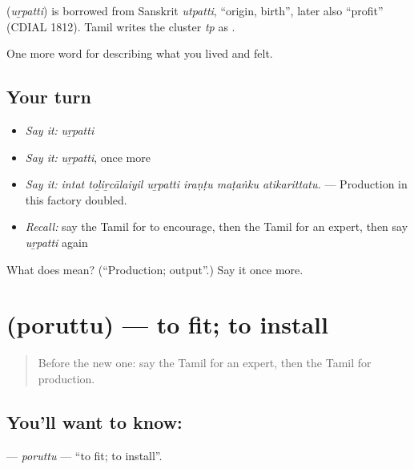 \begin{cousinweb}
\textbf{} (\emph{uṟpatti}) is borrowed from Sanskrit \emph{utpatti}, \textquotedblleft{}origin, birth\textquotedblright{}, later also \textquotedblleft{}profit\textquotedblright{} (CDIAL 1812). Tamil writes the cluster \emph{tp} as .
\end{cousinweb}

\begin{grammarlens}[title={What you've built}]
One more word for describing what you lived and felt.
\end{grammarlens}

\subsection*{Your turn}
\begin{itemize}
\raggedright
  \item \emph{Say it:} \emph{uṟpatti}
  \item \emph{Say it:} \emph{uṟpatti}, once more
  \item \emph{Say it:} \emph{intat toḻiṟcālaiyil uṟpatti iraṇṭu maṭaṅku atikarittatu.} — Production in this factory doubled.
  \item \emph{Recall:} say the Tamil for to encourage, then the Tamil for an expert, then say \emph{uṟpatti} again
\end{itemize}

\begin{tcolorbox}[breakable,colback=teal!4,colframe=teal!35!black,title={Before you move on}]
What does  mean? (\textquotedblleft{}Production; output\textquotedblright{}.) Say it once more.
\end{tcolorbox}
\section[\texorpdfstring{\ta{பொருத்து} (poruttu)}{பொருத்து (poruttu)}]{ (poruttu) — to fit; to install}

\label{lesson:TA-C510-poruttu}



\begin{quote}
Before the new one: say the Tamil for an expert, then the Tamil for production.
\end{quote}

\subsection*{You'll want to know: }
\textbf{} — \emph{poruttu} — \textquotedblleft{}to fit; to install\textquotedblright{}.

